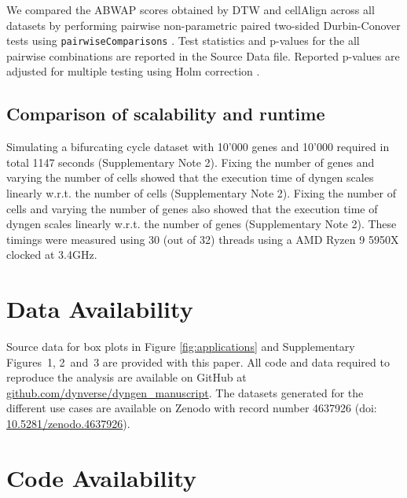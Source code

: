 \documentclass[10pt, a4paper]{article}
\begin{document}
We compared the ABWAP scores obtained by DTW and cellAlign across all
datasets by performing pairwise non-parametric paired two-sided
Durbin-Conover tests
\cite{conover_multiplecomparisonsprocedures_1979} using
\texttt{pairwiseComparisons}
\cite{patil_pairwisecomparisonsmultiplepairwise_2019}. Test
statistics and p-values for the all pairwise combinations are reported
in the Source Data file. Reported p-values are adjusted for multiple
testing using Holm correction
\cite{holm_simplesequentiallyrejective_1979}.

\hypertarget{comparison-of-scalability-and-runtime}{%
	\subsection*{Comparison of scalability and
		runtime}\label{comparison-of-scalability-and-runtime}}

Simulating a bifurcating cycle dataset with 10'000 genes and 10'000
required in total 1147 seconds (Supplementary Note 2). Fixing the number
of genes and varying the number of cells showed that the execution time
of dyngen scales linearly w.r.t. the number of cells (Supplementary Note
2). Fixing the number of cells and varying the number of genes also
showed that the execution time of dyngen scales linearly w.r.t. the
number of genes (Supplementary Note 2). These timings were measured
using 30 (out of 32) threads using a AMD Ryzen 9 5950X clocked at
3.4GHz.

\hypertarget{data-availability}{%
	\section*{Data Availability}\label{data-availability}}

Source data for box plots in Figure \ref{fig:applications} and
Supplementary Figures~1, 2~and~3 are provided with this paper. All code
and data required to reproduce the analysis are available on GitHub at
\href{https://github.com/dynverse/dyngen_manuscript}{github.com/dynverse/dyngen\_manuscript}.
The datasets generated for the different use cases are available on
Zenodo with record number 4637926 (doi:
\href{https://doi.org/10.5281/zenodo.4637926}{10.5281/zenodo.4637926}).

\hypertarget{code-availability}{%
	\section*{Code Availability}\label{code-availability}}
\end{document}
